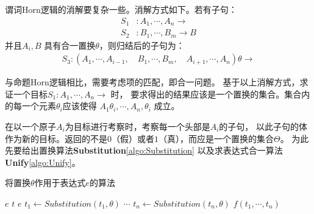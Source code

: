 谓词Horn逻辑的消解要复杂一些。消解方式如下。若有子句：
\begin{align*}
  S_1 &: A_1 , \cdots, A_n \rightarrow \\
  S_2 &: B_1 , \cdots, B_m \rightarrow B
\end{align*}
并且$A_i, B$ 具有合一置换$\theta$，则归结后的子句为：
\begin{align*}
  S_3: (A_1, \cdots, A_{i-1}, \quad B_1, \cdots, B_m, \quad %
  A_{i+1}, \cdots, A_n) \theta \rightarrow
\end{align*}

与命题Horn逻辑相比，需要考虑项的匹配，即合一问题。
基于以上消解方式，求证一个目标$S_1:A_1, \cdots, A_n \rightarrow$ 时，
要求得出的结果应该是一个置换的集合。集合内的每一个元素$\theta_i$应该使得
$A_1\theta_i,\cdots,A_n,\theta_i$ 成立。

在以一个原子$A_i$为目标进行考察时，考察每一个头部是$A_i$的子句，
以此子句的体作为新的目标。返回的不是$0$（假）或者$1$（真），而应是一个置换的集合$\Theta$。
为此先要给出置换算法\textbf{Substitution}\cref{algo:Substitution}
以及求表达式合一算法\textbf{Unify}\cref{algo:Unify}。

\begin{algorithm}[H]
  \caption{将置换$\theta$作用于表达式$e$的算法}
  \label{algo:Substitution}
  \begin{algorithmic}[1]
    \State\Return $e$
    \EndIf
    \State\Return $t$
    \Else
    \State\Return $e$
    \EndIf
    \EndIf
    \State $t_1  \gets Substitution(t_1, \theta)$
    \State $\cdots$
    \State $t_n  \gets Substitution(t_n, \theta)$
    \State\Return $f(t_1,\cdots,t_n)$
    \EndIf
    \EndFunction
  \end{algorithmic}
\end{algorithm}

